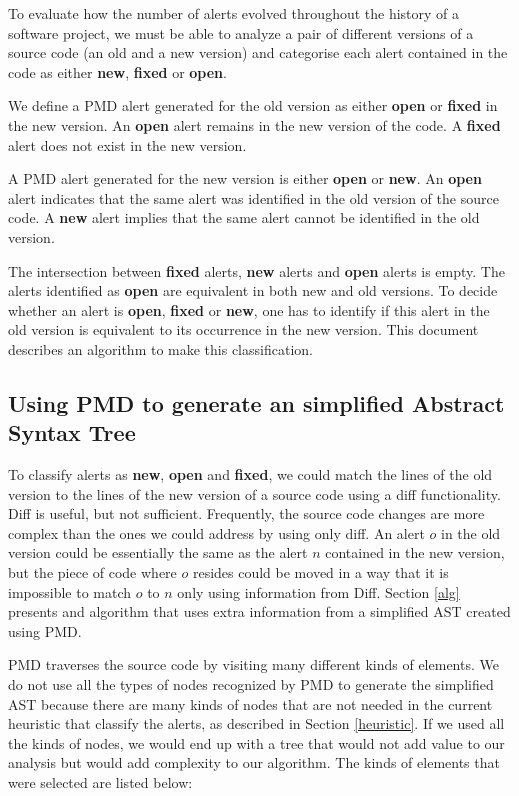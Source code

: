 \documentclass[
]{article}
\begin{document}
To evaluate how the number of alerts evolved throughout the history of a
software project, we must be able to analyze a pair of different
versions of a source code (an old and a new version) and categorise each
alert contained in the code as either \textbf{new}, \textbf{fixed} or
\textbf{open}.

We define a PMD alert generated for the old version as either
\textbf{open} or \textbf{fixed} in the new version. An \textbf{open}
alert remains in the new version of the code. A \textbf{fixed} alert
does not exist in the new version.

A PMD alert generated for the new version is either \textbf{open} or
\textbf{new}. An \textbf{open} alert indicates that the same alert was
identified in the old version of the source code. A \textbf{new} alert
implies that the same alert cannot be identified in the old version.

The intersection between \textbf{fixed} alerts, \textbf{new} alerts and
\textbf{open} alerts is empty. The alerts identified as \textbf{open}
are equivalent in both new and old versions. To decide whether an alert
is \textbf{open}, \textbf{fixed} or \textbf{new}, one has to identify if
this alert in the old version is equivalent to its occurrence in the new
version. This document describes an algorithm to make this
classification.

\subsection{Using PMD to generate an simplified Abstract Syntax Tree }\label{ast}

To classify alerts as \textbf{new}, \textbf{open}
and \textbf{fixed}, we could match the lines of the old version to the
lines of the new version of a source code using a diff functionality. 
Diff is useful, but not sufficient. Frequently, the source code changes
are more complex than the ones we could address by using only diff. An
alert \(o\) in the old version could be essentially the same as the alert
\(n\) contained in the new version, but the piece of code where \(o\)
resides could be moved in a way that it is impossible to match \(o\) 
to \(n\) only using information from Diff. Section \ref{alg} presents
and algorithm that uses extra information from a simplified AST created
using PMD.

PMD traverses the source code by visiting many different kinds of elements.
We do not use all the types of nodes recognized by PMD to generate the 
simplified AST because there are many kinds of nodes that are not needed 
in the current heuristic that classify the alerts, as described in Section 
\ref{heuristic}. If we used all the kinds of nodes, we would end up with
a tree that would not add value to our analysis but would add complexity 
to our algorithm. The kinds of elements that were selected are listed below:
\end{document}
